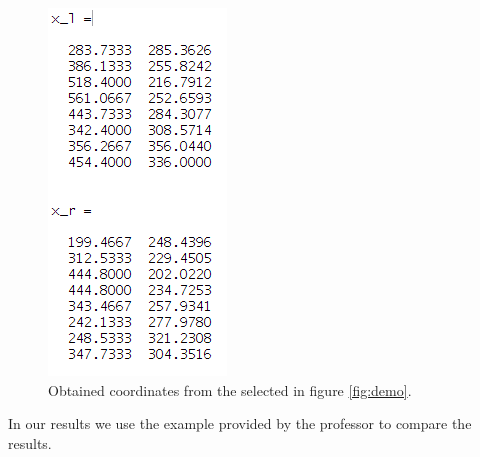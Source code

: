 \documentclass[a4paper,12pt]{article}
\begin{document}
    \begin{figure}[h]
        \centering
        \includegraphics[totalheight=.24\textheight]{./images/ExamplePts.png}
        \caption{Obtained coordinates from the selected in figure \ref{fig:demo}.}
        \label{fig:pts}
    \end{figure}

    In our results we use the example provided by the professor to compare the results. \\
\end{document}
